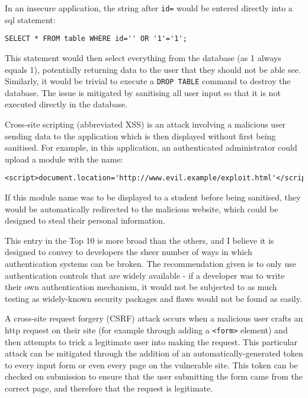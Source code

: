 In an insecure application, the string after \texttt{id=} would be entered
directly into a \gls{sql} statement:

\begin{lstlisting}
SELECT * FROM table WHERE id='' OR '1'='1';
\end{lstlisting}

This statement would then select everything from the database (as 1 always
equals 1), potentially returning data to the user that they should not be able
see. Similarly, it would be trivial to execute a \texttt{DROP TABLE} command
to destroy the database. The issue is mitigated by sanitising all user input
so that it is not executed directly in the database.


Cross-site scripting (abbreviated XSS) is an attack involving a malicious user
sending data to the application which is then displayed without first being
sanitised. For example, in this application, an authenticated administrator
could upload a module with the name:

\begin{lstlisting}
<script>document.location='http://www.evil.example/exploit.html'</script>
\end{lstlisting}

If this module name was to be displayed to a student before being sanitised,
they would be automatically redirected to the malicious website, which could
be designed to steal their personal information.


This entry in the Top 10 is more broad than the others, and I believe it is
designed to convey to developers the sheer number of ways in which
authentication systems can be broken. The recommendation given is to only use
authentication controls that are widely available - if a developer was to
write their own authentication mechanism, it would not be subjected to as much
testing as widely-known security packages and flaws would not be found as
easily.


A cross-site request forgery (CSRF) attack occurs when a malicious user crafts
an \gls{http} request on their site (for example through adding a
\texttt{<form>} element) and then attempts to trick a legitimate user into
making the request. This particular attack can be mitigated through the
addition of an automatically-generated token to every input form or even every
page on the vulnerable site. This token can be checked on submission to ensure
that the user submitting the form came from the correct page, and therefore
that the request is legitimate.

